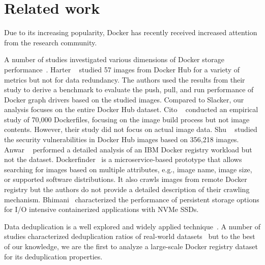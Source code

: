 \section{Related work}
\label{sec:related}

Due to its increasing popularity, Docker has recently received increased
attention from the research community.

A number of studies investigated various dimensions of Docker storage
performance~\cite{dockerssd,shifter,slacker,exoclones,docker-driver-eval,
improve-cow-container-drivers, cntr}.
%
Harter \etal~\cite{slacker} studied 57 images from Docker Hub for a variety of metrics
but not for data redundancy.
The authors used the results from their study to derive a benchmark to evaluate
the push, pull, and run performance of Docker graph drivers based on the studied
images. Compared to Slacker, our analysis focuses on the entire Docker Hub dataset.
%
Cito \etal~\cite{analysisdockergithub} conducted an empirical study of 70,000
Dockerfiles, focusing on the image build process but not image contents.
However, their study did not focus on actual image data.
%
Shu \etal~\cite{dockervulnerabile} studied the security vulnerabilities in Docker Hub
images based on 356,218 images.
%
Anwar \etal~\cite{dockerworkload} performed a detailed analysis
of an IBM Docker registry workload but not the dataset.
%
%
Dockerfinder~\cite{dockerfinder} is a microservice-based prototype that allows searching
for images based on  multiple attributes, e.g., image name, image size, or supported software 
distributions. It also crawls images from remote Docker registry but the authors do
not provide a detailed description of their crawling mechanism.
Bhimani~\cite{dockerssd} \etal characterized the performance of persistent storage options
for I/O intensive containerized applications with NVMe SSDs.

Data deduplication is a well
explored and widely applied technique~\cite{2009-sparse_indexing_inline_dedup_using_sampling-fast,
2001-low_bandwidth_network_fs-sosp,
2012-idedup-fast,
tarasov2014dmdedup,
2008-avoid_disk_bottleneck_data_domain_dedupfs-fast}.
%
A number of studies characterized deduplication ratios of
real-world datasets~\cite{2009-dedup_effectiveness_on_vm_disk_images-systor,
2012-data_reduction_in_primary_storage-systor,
2012-hpc_practical_dedup_study-sc,
2013-charact_increment_changes_data_protect-atc,
msst16dedup-study,
2012-charact_backup_workloads-fast,
2013-charact_dedup_effic_big_data-iiswc}
but to the best of our knowledge, we are the first to analyze a large-scale Docker
registry dataset for its deduplication properties.


